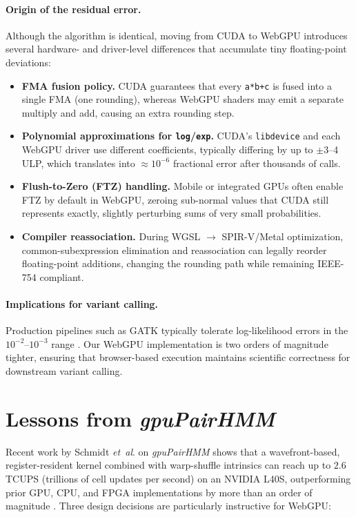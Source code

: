 \documentclass[PhD]{PHlab-thesis}
\begin{document}
\paragraph{Origin of the residual error.}
Although the algorithm is identical, moving from CUDA to WebGPU introduces several hardware- and driver-level differences that accumulate tiny floating-point deviations:
\begin{itemize}
  \item \textbf{FMA fusion policy.} CUDA guarantees that every \texttt{a*b+c} is fused into a single FMA (one rounding), whereas WebGPU shaders may emit a separate multiply and add, causing an extra rounding step.
  \item \textbf{Polynomial approximations for \texttt{log}/\texttt{exp}.} CUDA’s \texttt{libdevice} and each WebGPU driver use different coefficients, typically differing by up to $\pm$3–4 ULP, which translates into $\approx10^{-6}$ fractional error after thousands of calls.
  \item \textbf{Flush-to-Zero (FTZ) handling.} Mobile or integrated GPUs often enable FTZ by default in WebGPU, zeroing sub-normal values that CUDA still represents exactly, slightly perturbing sums of very small probabilities.
  \item \textbf{Compiler reassociation.} During WGSL $\rightarrow$ SPIR-V/Metal optimization, common-subexpression elimination and reassociation can legally reorder floating-point additions, changing the rounding path while remaining IEEE-754 compliant.
\end{itemize}

\paragraph{Implications for variant calling.}
Production pipelines such as GATK typically tolerate log-likelihood errors in the $10^{-2}$–$10^{-3}$ range \cite{McKenna2010}. Our WebGPU implementation is two orders of magnitude tighter, ensuring that browser-based execution maintains scientific correctness for downstream variant calling.





\section{Lessons from \textit{gpuPairHMM}}
Recent work by Schmidt \emph{et~al}. on \textit{gpuPairHMM} shows that a wavefront-based, register-resident kernel combined with warp-shuffle intrinsics can reach up to $2.6$ TCUPS (trillions of cell updates per second) on an NVIDIA L40S, outperforming prior GPU, CPU, and FPGA implementations by more than an order of magnitude \cite{Schmidt2024-gpuPairHMM}. Three design decisions are particularly instructive for WebGPU:
\end{document}
